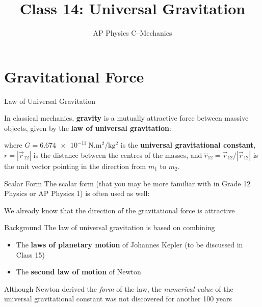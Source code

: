 \documentclass[12pt,compress,aspectratio=169]{beamer}
\title{Class 14: Universal Gravitation}
\subtitle{AP Physics C--Mechanics}
\begin{document}
\begin{frame}
  \maketitle
\end{frame}


\section{Gravitational Force}

\begin{frame}{Law of Universal Gravitation}
  \begin{center}
  \end{center}

  In classical mechanics, \textbf{gravity} is a mutually attractive force
  between massive objects, given by the \textbf{law of universal gravitation}:


  where $G=\SI{6.674e-11}{\newton.\metre\squared\per\kilo\gram\squared}$ is the
  \textbf{universal gravitational constant}, $r=|\vec r_{12}|$ is the distance
  between the centres of the masses, and $\hat r_{12}=\vec r_{12}/|\vec r_{12}|$
  is the unit vector pointing in the direction from $m_1$ to $m_2$.
\end{frame}


\begin{frame}{Scalar Form}
  The scalar form (that you may be more familiar with in Grade 12 Physics or
  AP Physics 1) is often used as well:


  We already know that the direction of the gravitational force is attractive
\end{frame}



\begin{frame}{Background}
  The law of universal gravitation is based on combining
  \begin{itemize}
  \item The \textbf{laws of planetary motion} of Johannes Kepler (to be
    discussed in Class 15)
  \item The \textbf{second law of motion} of Newton
  \end{itemize}
  Although Newton derived the \emph{form} of the law, the \emph{numerical value}
  of the universal gravitational constant was not discovered for another 100
  years
\end{frame}
\end{document}
